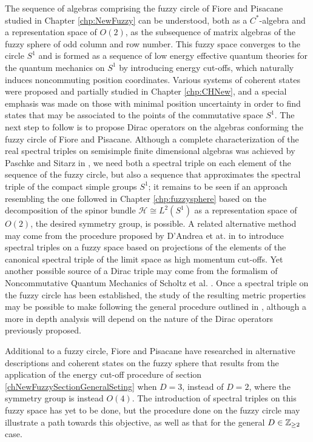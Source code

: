 \documentclass[12pt]{report}
\theoremstyle{definition}
\newcommand{\hcal}{\mathcal H}
\begin{document}
The sequence of algebras comprising the fuzzy circle of Fiore and Pisacane studied in Chapter \ref{chp:NewFuzzy} can be understood, both as a $C^*$-algebra and a representation space of $O(2)$, as the subsequence of matrix algebras of the fuzzy sphere of odd column and row number. This fuzzy space converges to the circle $S^1$ and is formed as a sequence of low energy effective quantum theories for the quantum mechanics on $S^1$ by introducing energy cut-offs, which naturally induces noncommuting position coordinates.
Various systems of coherent states were proposed and partially studied in Chapter \ref{chp:CHNew}, and a special emphasis was made on those with minimal position uncertainty in order to find states that may be associated to the points of the commutative space $S^1$.
The next step to follow is to propose Dirac operators on the algebras conforming the fuzzy circle of Fiore and Pisacane. Although a complete characterization of the real spectral triples on semisimple finite dimensional algebras was achieved by Paschke and Sitarz in  \cite{PaschkeSitarz1998}, we need both a spectral triple on each element of the sequence of the fuzzy circle, but also a sequence that approximates the spectral triple of the compact simple groups $S^1$; it remains to be seen if an approach resembling the one followed in Chapter \ref{chp:fuzzysphere} based on the decomposition of the spinor bundle $\hcal \cong L^2(S^1)$ as a representation space of $O(2)$, the desired symmetry group, is possible. A related alternative method may come from the procedure proposed by D'Andrea et at. in \cite{DAndrea2014} to introduce spectral triples on a fuzzy space based on projections of the elements of the canonical spectral triple of the limit space as high momentum cut-offs. Yet another possible source of a Dirac triple may come from the formalism of Noncommutative Quantum Mechanics of Scholtz et al. \cite{Scholtz2009,Scholtz2013}. Once a spectral triple on the fuzzy circle has been established, the study of the resulting metric properties may be possible to make following the general procedure outlined in \cite{ChaobaDevi2018}, although a more in depth analysis will depend on the nature of the Dirac operators previously proposed. 

Additional to a fuzzy circle, Fiore and Pisacane have researched in \cite{Fiore2018, FioreXi2020, FioreCoherent2020} alternative descriptions and coherent states on the fuzzy sphere that results from the application of the energy cut-off procedure of section \ref{chNewFuzzySectionGeneralSeting} when $D = 3$, instead of $D=2$, where the symmetry group is instead $O(4)$. The introduction of spectral triples on this fuzzy space has yet to be done, but the procedure done on the fuzzy circle may illustrate a path towards this objective, as well as that for the general $ D \in \mathbb{Z}_{\geq 2}$ case.


\printbibliography
\end{document}
